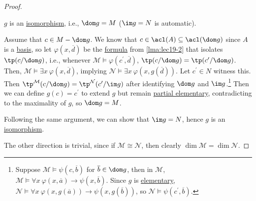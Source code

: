 \begin{proof}
	\begin{claim}
		\(g\) is an \hyperref[def:isomorphism]{isomorphism}, i.e., \(\dom g = M \) (\(\im g = N\) is automatic).
	\end{claim}
	\begin{explanation}
		Assume that \(c \in M - \dom g\). We know that \(c\in \acl(A) \subseteq \acl(\dom g)\) since \(A\) is a \hyperref[def:basis]{basis}, so let \(\varphi (x, \overline{d} )\) be the \hyperref[def:formula]{formula} from \autoref{lma:lec19-2} that isolates \(\tp(c / \dom g)\), i.e., whenever \(\mathcal{M} \models \varphi (c^{\prime} , \overline{d} )\), \(\tp(c / \dom g) = \tp(c ^{\prime} / \dom g)\). Then, \(\mathcal{M} \models \exists x\ \varphi (x, \overline{d} )\), implying \(\mathcal{N} \models \exists x\ \varphi (x, g(\overline{d} ))\). Let \(c^{\prime} \in N\) witness this. Then \(\tp^{\mathcal{M} } (c / \dom g) = \tp^{\mathcal{N} } (c^{\prime} / \im g)\) after identifying \(\dom g\) and \(\im g\).\footnote{Suppose \(\mathcal{M} \models \psi (c, \overline{b} )\) for \(\overline{b} \in \dom g\), then in \(\mathcal{M} \), \(\mathcal{M} \models \forall x\ \varphi (x, \overline{a} )\to \psi (x, \overline{b} )\). Since \(g\) is \hyperref[def:partial-elementary-map]{elementary}, \(\mathcal{N} \models \forall x\ \varphi (x, g(\overline{a} )) \to \psi (x, g(\overline{b} ))\), so \(\mathcal{N} \models \psi (c^{\prime} , \overline{b} )\).} Then we can define \(g(c) = c^{\prime} \) to extend \(g\) but remain \hyperref[def:partial-elementary-map]{partial elementary}, contradicting to the maximality of \(g\), so \(\dom g = M\).

		Following the same argument, we can show that \(\im g = N\), hence \(g\) is an \hyperref[def:isomorphism]{isomorphism}.
	\end{explanation}
	The other direction is trivial, since if \(\mathcal{M} \cong \mathcal{N} \), then clearly \(\dim \mathcal{M} = \dim \mathcal{N} \).
\end{proof}